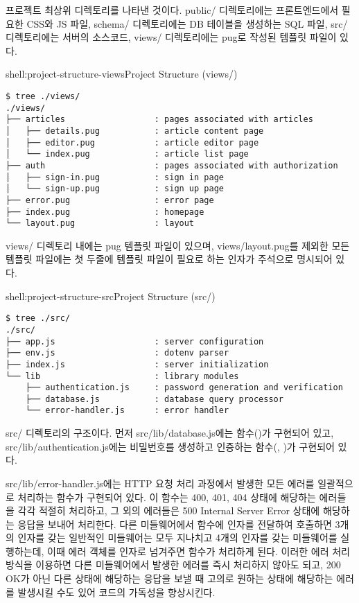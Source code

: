 \는 프로젝트 최상위 디렉토리를 나타낸 것이다. public/ 디렉토리에는 프론트엔드에서 필요한 CSS와 JS 파일, schema/ 디렉토리에는 DB 테이블을 생성하는 SQL 파일, src/ 디렉토리에는 서버의 소스코드, views/ 디렉토리에는 pug로 작성된 템플릿 파일이 있다.

\begin{shell}{shell:project-structure-views}{Project Structure (views/)}
\begin{verbatim}
$ tree ./views/
./views/
├── articles                  : pages associated with articles
│   ├── details.pug           : article content page
│   ├── editor.pug            : article editor page
│   └── index.pug             : article list page
├── auth                      : pages associated with authorization
│   ├── sign-in.pug           : sign in page
│   └── sign-up.pug           : sign up page
├── error.pug                 : error page
├── index.pug                 : homepage
└── layout.pug                : layout
\end{verbatim}
\end{shell}

views/ 디렉토리 내에는 pug 템플릿 파일이 있으며, views/layout.pug를 제외한 모든 템플릿 파일에는 첫 두줄에 템플릿 파일이 필요로 하는 인자가 주석으로 명시되어 있다.

\begin{shell}{shell:project-structure-src}{Project Structure (src/)}
\begin{verbatim}
$ tree ./src/
./src/
├── app.js                    : server configuration
├── env.js                    : dotenv parser
├── index.js                  : server initialization
└── lib                       : library modules
    ├── authentication.js     : password generation and verification
    ├── database.js           : database query processor
    └── error-handler.js      : error handler
\end{verbatim}
\end{shell}

\는 src/ 디렉토리의 구조이다. 먼저 src/lib/database.js에는  함수()가 구현되어 있고, src/lib/authentication.js에는 비밀번호를 생성하고 인증하는 함수(, )가 구현되어 있다.

src/lib/error-handler.js에는 HTTP 요청 처리 과정에서 발생한 모든 에러를 일괄적으로 처리하는  함수가 구현되어 있다. 이 함수는 400, 401, 404 상태에 해당하는 에러들을 각각 적절히 처리하고, 그 외의 에러들은 500 Internal Server Error 상태에 해당하는 응답을 보내어 처리한다. 다른 미들웨어에서  함수에 인자를 전달하여 호출하면 3개의 인자를 갖는 일반적인 미들웨어는 모두 지나치고 4개의 인자를 갖는 미들웨어를 실행하는데, 이때 에러 객체를 인자로 넘겨주면  함수가 처리하게 된다. 이러한 에러 처리 방식을 이용하면 다른 미들웨어에서 발생한 에러를 즉시 처리하지 않아도 되고, 200 OK가 아닌 다른 상태에 해당하는 응답을 보낼 때 고의로 원하는 상태에 해당하는 에러를 발생시킬 수도 있어 코드의 가독성을 향상시킨다.

